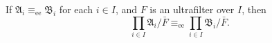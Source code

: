 If $\mathfrak{A}_i \equiv_{\text{ee}} \mathfrak{B}_i$ for each $i \in I$, and $F$ is an ultrafilter over $I$, then
$$\prod_{i \in I} \mathfrak{A}_i / \bar{F} \equiv_{\text{ee}} \prod_{i \in I} \mathfrak{B}_i / \bar{F}.$$
